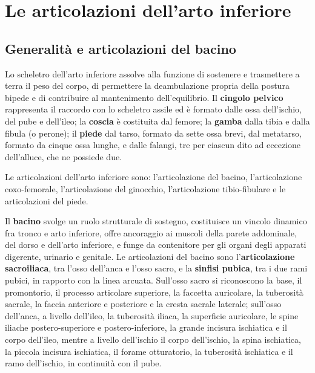 \chapter{Le articolazioni dell'arto inferiore}

\section{Generalità e articolazioni del bacino}

Lo scheletro dell'arto inferiore assolve alla funzione di sostenere e
trasmettere a terra il peso del corpo, di permettere la deambulazione
propria della postura bipede e di contribuire al mantenimento
dell'equilibrio. Il \textbf{cingolo pelvico} rappresenta il raccordo con lo
scheletro assile ed è formato dalle ossa dell'ischio, del pube e
dell'ileo; la \textbf{coscia} è costituita dal femore; la \textbf{gamba}
dalla tibia e dalla fibula (o perone); il \textbf{piede} dal tarso, formato
da sette ossa brevi, dal metatarso, formato da cinque ossa lunghe, e dalle
falangi, tre per ciascun dito ad eccezione dell'alluce, che ne possiede
due.

Le articolazioni dell'arto inferiore sono: l'articolazione del bacino,
l'articolazione coxo-femorale, l'articolazione del ginocchio,
l'articolazione tibio-fibulare e le articolazioni del piede.

Il \textbf{bacino} svolge un ruolo strutturale di sostegno, costituisce un
vincolo dinamico fra tronco e arto inferiore, offre ancoraggio ai muscoli
della parete addominale, del dorso e dell'arto inferiore, e funge da
contenitore per gli organi degli apparati digerente, urinario e genitale.
Le articolazioni del bacino sono l'\textbf{articolazione sacroiliaca}, tra
l'osso dell'anca e l'osso sacro, e la \textbf{sinfisi pubica}, tra i due
rami pubici, in rapporto con la linea arcuata. Sull'osso sacro si
riconoscono la base, il promontorio, il processo articolare superiore, la
faccetta auricolare, la tuberosità sacrale, la faccia anteriore e
posteriore e la cresta sacrale laterale; sull'osso dell'anca, a livello
dell'ileo, la tuberosità iliaca, la superficie auricolare, le spine
iliache postero-superiore e postero-inferiore, la grande incisura
ischiatica e il corpo dell'ileo, mentre a livello dell'ischio il corpo
dell'ischio, la spina ischiatica, la piccola incisura ischiatica, il
forame otturatorio, la tuberosità ischiatica e il ramo dell'ischio, in
continuità con il pube.

